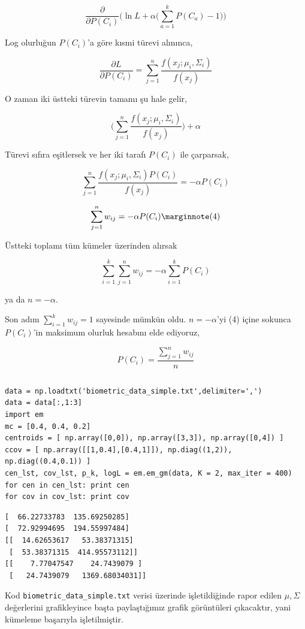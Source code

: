 \documentclass[12pt,fleqn]{article}\usepackage{../../common}
\begin{document}
$$ 
\frac{\partial }{\partial P(C_i)} \bigg(
\ln L + \alpha \big( \sum_{a=1}^{k} P(C_a)-1 \big)
\bigg)
$$

Log olurluğun $P(C_i)$'a göre kısmi türevi alınınca,

$$ 
\frac{\partial L}{\partial P(C_i)} = 
\sum_{j=1}^{n} \frac{f(x_j;\mu_i,\Sigma_i)}{f(x_j)}
$$

O zaman iki üstteki türevin tamamı şu hale gelir,

$$ 
\bigg( \sum_{j=1}^{n} \frac{f(x_j;\mu_i,\Sigma_i)}{f(x_j)} \bigg) + \alpha
$$

Türevi sıfıra eşitlersek ve her iki tarafı $P(C_i)$ ile çarparsak, 

$$ 
\sum_{j=1}^{n} \frac{f(x_j;\mu_i,\Sigma_i) P(C_i)}{f(x_j)} = -\alpha P(C_i)
$$

$$ 
\sum_{j=1}^{n} w_{ij} = -\alpha P(C_i)
\mlabel{4}
$$

Üstteki toplamı tüm kümeler üzerinden alırsak

$$ 
\sum_{i=1}^{k} \sum_{j=1}^{n} w_{ij} = -\alpha \sum_{i=1}^{k} P(C_i)
$$

ya da $n = -\alpha$. 


Son adım $\sum_{i=1}^{k}w_{ij}=1$ sayesinde mümkün oldu. $n = -\alpha$'yi
(4) içine sokunca $P(C_i)$'in maksimum olurluk hesabını elde ediyoruz, 

$$ P(C_i) = \frac{\sum_{j=1}^{n}w_{ij}}{n}$$


\inputminted[fontsize=\footnotesize]{python}{em.py}

\begin{verbatim}
data = np.loadtxt('biometric_data_simple.txt',delimiter=',')
data = data[:,1:3]
import em
mc = [0.4, 0.4, 0.2] 
centroids = [ np.array([0,0]), np.array([3,3]), np.array([0,4]) ]
ccov = [ np.array([[1,0.4],[0.4,1]]), np.diag((1,2)), np.diag((0.4,0.1)) ]
cen_lst, cov_lst, p_k, logL = em.em_gm(data, K = 2, max_iter = 400)
for cen in cen_lst: print cen
for cov in cov_lst: print cov
\end{verbatim}

\begin{verbatim}
[  66.22733783  135.69250285]
[  72.92994695  194.55997484]
[[  14.62653617   53.38371315]
 [  53.38371315  414.95573112]]
[[    7.77047547    24.7439079 ]
 [   24.7439079   1369.68034031]]
\end{verbatim}
Kod \verb!biometric_data_simple.txt! verisi üzerinde işletildiğinde rapor
edilen $\mu,\Sigma$ değerlerini grafikleyince başta paylaştığımız grafik
görüntüleri çıkacaktır, yani kümeleme başarıyla işletilmiştir.
\end{document}
